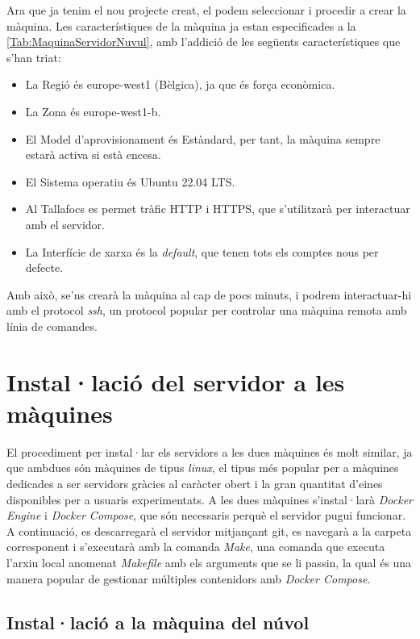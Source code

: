 Ara que ja tenim el nou projecte creat, el podem seleccionar i procedir a crear la màquina. Les característiques de la màquina ja estan especificades a la \autoref{Tab:MaquinaServidorNuvul}, amb l'addició de les següents característiques que s'han triat:

\begin{itemize} \item La Regió és europe-west1 (Bèlgica), ja que és força econòmica. \item La Zona és europe-west1-b. \item El Model d'aprovisionament és Estàndard, per tant, la màquina sempre estarà activa si està encesa. \item El Sistema operatiu és Ubuntu 22.04 LTS. \item Al Tallafocs es permet tràfic HTTP i HTTPS, que s'utilitzarà per interactuar amb el servidor. \item La Interfície de xarxa és la \textit{default}, que tenen tots els comptes nous per defecte. \end{itemize}

Amb això, se'ns crearà la màquina al cap de pocs minuts, i podrem interactuar-hi amb el protocol \textit{ssh}, un protocol popular per controlar una màquina remota amb línia de comandes.

\newpage
\section{Instal·lació del servidor a les màquines}

El procediment per instal·lar els servidors a les dues màquines és molt similar, ja que ambdues són màquines de tipus \textit{linux}, el tipus més popular per a màquines dedicades a ser servidors gràcies al caràcter obert i la gran quantitat d'eines disponibles per a usuaris experimentats. A les dues màquines s'instal·larà \textit{Docker Engine} i \textit{Docker Compose}, que són necessaris perquè el servidor pugui funcionar. A continuació, es descarregarà el servidor mitjançant git, es navegarà a la carpeta corresponent i s'executarà amb la comanda \textit{Make}, una comanda que executa l'arxiu local anomenat \textit{Makefile} amb els arguments que se li passin, la qual és una manera popular de gestionar múltiples contenidors amb \textit{Docker Compose}.

\subsection{Instal·lació a la màquina del núvol}

